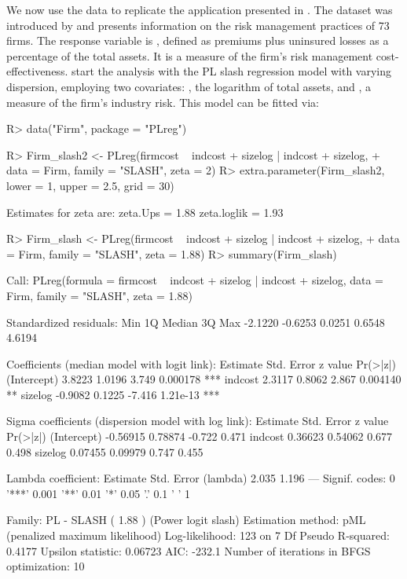 We now use the  data to replicate the application presented in \citet[Section 6.2]{QueirozFerrari2023}. The dataset was introduced by \cite{SchmitRoth1990} and presents information on the risk management practices of 73 firms. The response variable is , defined as premiums plus uninsured losses as a percentage of the total assets. It is a measure of the firm’s risk management cost-effectiveness. \cite{QueirozFerrari2023} start the analysis with the PL slash regression model with varying dispersion, employing two covariates: , the logarithm of total assets,
and , a measure of the firm’s industry risk. This model can be fitted via: 
\begin{Schunk}
\begin{Sinput}
R> data("Firm", package = "PLreg")

R> Firm_slash2 <- PLreg(firmcost ~ indcost + sizelog | indcost + sizelog,
+			data = Firm, family = "SLASH", zeta = 2)
R> extra.parameter(Firm_slash2, lower = 1, upper = 2.5, grid = 30)
\end{Sinput}
\begin{Soutput}
Estimates for zeta are: 
zeta.Ups = 1.88
zeta.loglik = 1.93
\end{Soutput}
\begin{Sinput}
R> Firm_slash <- PLreg(firmcost ~ indcost + sizelog | indcost + sizelog,
+                    data = Firm, family = "SLASH", zeta = 1.88)
R> summary(Firm_slash)
\end{Sinput}
\begin{Soutput}
Call:
PLreg(formula = firmcost ~ indcost + sizelog | indcost + sizelog, 
	data = Firm, family = "SLASH", zeta = 1.88)

Standardized residuals:
    Min      1Q  Median      3Q     Max 
-2.1220 -0.6253  0.0251  0.6548  4.6194 

Coefficients (median model with logit link):
            Estimate Std. Error z value Pr(>|z|)    
(Intercept)   3.8223     1.0196   3.749 0.000178 ***
indcost       2.3117     0.8062   2.867 0.004140 ** 
sizelog      -0.9082     0.1225  -7.416 1.21e-13 ***

Sigma coefficients (dispersion model with log link):
            Estimate Std. Error z value Pr(>|z|)
(Intercept) -0.56915    0.78874  -0.722    0.471
indcost      0.36623    0.54062   0.677    0.498
sizelog      0.07455    0.09979   0.747    0.455

Lambda coefficient:
         Estimate Std. Error
(lambda)    2.035      1.196
---
Signif. codes:  0 '***' 0.001 '**' 0.01 '*' 0.05 '.' 0.1 ' ' 1 

Family: PL - SLASH ( 1.88 ) (Power logit slash)
Estimation method: pML (penalized maximum likelihood)
Log-likelihood:   123 on 7 Df
Pseudo R-squared: 0.4177
Upsilon statistic: 0.06723
AIC: -232.1
Number of iterations in BFGS optimization: 10
\end{Soutput}
\end{Schunk}

